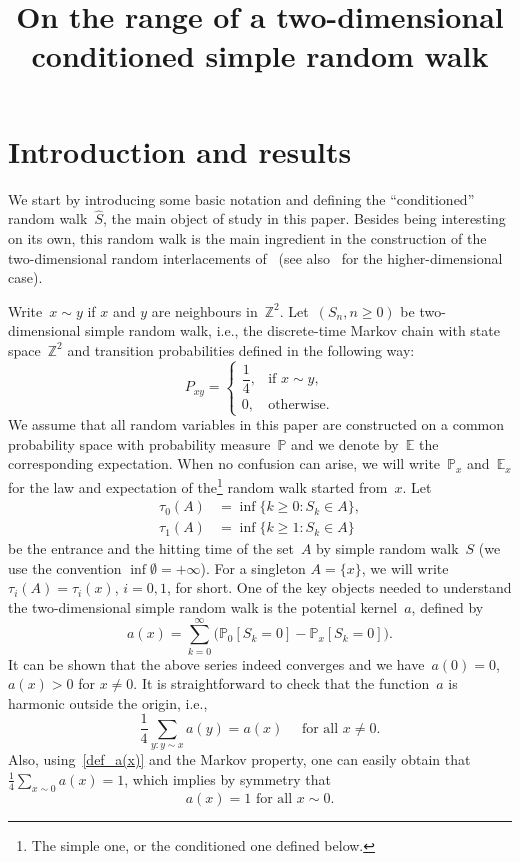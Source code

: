 \documentclass[AHL,Unicode,longabstracts]{cedram}
\title[Range of two-dimensional conditioned SRW]{On the range of a two-dimensional conditioned simple random walk}
\author[\initial{N.} \lastname{Gantert}]{\firstname{Nina} \lastname{Gantert}}
\author[\initial{S.} \lastname{Popov}]{\firstname{Serguei} \lastname{Popov}}
\author[\initial{M.} \lastname{Vachkovskaia}]{\firstname{Marina} \lastname{Vachkovskaia}}
\newcommand{\1}[1]{{\mathbf 1}{\{#1\}}}
\newcommand{\Z}{\mathbb{Z}}
\newcommand{\s}{{\widehat S}}
\newcommand{\8}{{\infty}}
\newcommand{\IP}{{\mathbb P}}
\newcommand{\IE}{{\mathbb E}}
\begin{document}
\maketitle

\section{Introduction and results}\label{s_introres}

We start by introducing some basic notation and defining the ``conditioned'' random walk~$\s$, the main object of study in this paper. Besides being interesting on its own, this random walk is the main ingredient in the construction of the two-dimensional random interlacements of~\cite{CP16,CPV16} (see also~\cite{CT12,DRS14,SLT,Szn10} for the higher-dimensional case).

Write~$x\sim y$ if $x$ and $y$ are neighbours in~$\Z^2$. Let~$(S_n, n\geq 0)$ be two-dimensional simple random walk, i.e., the discrete-time Markov chain with state space~$\Z^2$ and transition probabilities defined in the following way:
\begin{equation}\label{def_S}
P_{xy} =
\begin{cases}
\dfrac{1}{4}, & \text{if }x\sim y,\\[0.6em]
0, & \text{otherwise}.
\end{cases}
\end{equation}
We assume that all random variables in this paper are constructed on a common probability space with probability measure~$\IP$ and we denote by~$\IE$ the corresponding expectation. When no confusion can arise, we will write~$\IP_x$ and~$\IE_x$ for the law and expectation of the\footnote{The simple one, or the conditioned one defined below.} random walk started from~$x$. Let
\begin{align}
\tau_0(A) &= \inf\{k\geq 0: S_k\in A\} \label{entrance_t},\\
\tau_1(A) &= \inf\{k\geq 1: S_k\in A\} \label{hitting_t}
\end{align}
be the entrance and the hitting time of the set~$A$ by simple random walk~$S$ (we use the convention $\inf \emptyset = +\8$). For a singleton $A=\{x\}$, we will write $\tau_i(A)=\tau_i(x)$, $i=0,1$, for short. One of the key objects needed to understand the two-dimensional simple random walk is the potential kernel~$a$, defined by
\begin{equation}\label{def_a(x)}
a(x) = \sum_{k=0}^\infty\big(\IP_0[S_k\!=\!0]-\IP_x[S_k\!=\!0]\big).
\end{equation}
It can be shown that the above series indeed converges and we have~$a(0)=0$, $a(x)>0$ for $x\neq 0$. It is straightforward to check that the function~$a$ is harmonic outside the origin, i.e.,
\begin{equation}\label{a_harm}
\frac{1}{4}\sum_{y: y\sim x}a(y) = a(x) \quad \text{ for all } x\neq 0.
\end{equation}
Also, using~\eqref{def_a(x)} and the Markov property, one can easily obtain that $\frac{1}{4}\sum_{x\sim 0}a(x)=1$, which implies by symmetry that
\begin{equation}\label{a(x)=1}
a(x)=1 \text{ for all }x\sim 0.
\end{equation}
\end{document}

